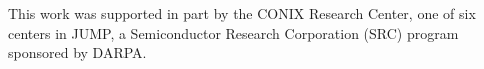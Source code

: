 \documentclass[acmsmall]{acmart}\settopmatter{}
\begin{document}
\begin{acks}                            %
This work was supported in part by the CONIX Research Center, one of six centers in JUMP, a Semiconductor Research Corporation (SRC) program sponsored by DARPA.
\end{acks}



\end{document}
